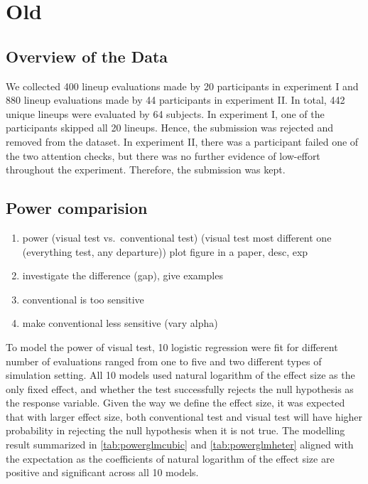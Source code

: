 \documentclass[]{interact}
\theoremstyle{plain}%
\theoremstyle{definition}
\theoremstyle{remark}
\providecommand{\tightlist}{%
  \setlength{\itemsep}{0pt}\setlength{\parskip}{0pt}}
\def\tightlist{}
\begin{document}
\hypertarget{old}{%
\section{Old}\label{old}}

\hypertarget{overview-of-the-data}{%
\subsection{Overview of the Data}\label{overview-of-the-data}}

We collected 400 lineup evaluations made by 20 participants in
experiment I and 880 lineup evaluations made by 44 participants in
experiment II. In total, 442 unique lineups were evaluated by 64
subjects. In experiment I, one of the participants skipped all 20
lineups. Hence, the submission was rejected and removed from the
dataset. In experiment II, there was a participant failed one of the two
attention checks, but there was no further evidence of low-effort
throughout the experiment. Therefore, the submission was kept.

\hypertarget{power-comparision}{%
\subsection{Power comparision}\label{power-comparision}}

\begin{enumerate}
\def\labelenumi{\arabic{enumi}.}
\tightlist
\item
  power (visual test vs.~conventional test) (visual test most different
  one (everything test, any departure)) plot figure in a paper, desc,
  exp
\item
  investigate the difference (gap), give examples
\item
  conventional is too sensitive
\item
  make conventional less sensitive (vary alpha)
\end{enumerate}

To model the power of visual test, 10 logistic regression were fit for
different number of evaluations ranged from one to five and two
different types of simulation setting. All 10 models used natural
logarithm of the effect size as the only fixed effect, and whether the
test successfully rejects the null hypothesis as the response variable.
Given the way we define the effect size, it was expected that with
larger effect size, both conventional test and visual test will have
higher probability in rejecting the null hypothesis when it is not true.
The modelling result summarized in \ref{tab:powerglmcubic} and
\ref{tab:powerglmheter} aligned with the expectation as the coefficients
of natural logarithm of the effect size are positive and significant
across all 10 models.
\end{document}
